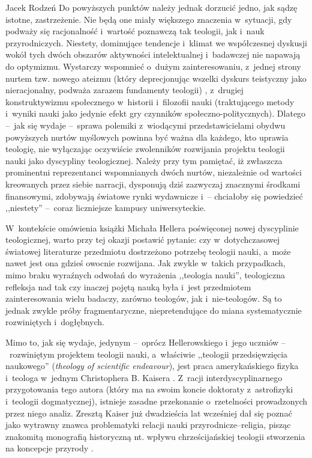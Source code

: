 \begin{newrevplenv}{Jacek Rodzeń}
Do powyższych punktów należy jednak dorzucić jedno, jak sądzę istotne, zastrzeżenie. Nie będą one miały większego znaczenia w~sytuacji, gdy podważy się racjonalność i~wartość poznawczą tak teologii, jak i~nauk przyrodniczych. Niestety, dominujące tendencje i~klimat we współczesnej dyskusji wokół tych dwóch obszarów aktywności intelektualnej i~badawczej nie napawają do optymizmu. Wystarczy wspomnieć o~dużym zainteresowaniu, z~jednej strony nurtem tzw. nowego ateizmu (który deprecjonując wszelki dyskurs teistyczny jako nieracjonalny, podważa zarazem fundamenty teologii)
\parencite[zob.][]{haught_god_2008}, %
 z~drugiej konstruktywizmu społecznego w~historii i~filozofii nauki (traktującego metody i~wyniki nauki jako jedynie efekt gry czynników społeczno-politycznych). Dlatego --~jak się wydaje --~sprawa polemiki z~wiodącymi przedstawicielami obydwu powyższych nurtów myślowych powinna być ważna dla każdego, kto uprawia teologię, nie wyłączając oczywiście zwolenników rozwijania projektu teologii nauki jako dyscypliny teologicznej. Należy przy tym pamiętać, iż zwłaszcza prominentni reprezentanci wspomnianych dwóch nurtów, niezależnie od wartości kreowanych przez siebie narracji, dysponują dziś zazwyczaj znacznymi środkami finansowymi, zdobywają światowe rynki wydawnicze i~– chciałoby się powiedzieć ,,niestety'' --~coraz liczniejsze kampusy uniwersyteckie.

W~kontekście omówienia książki Michała Hellera poświęconej nowej dyscyplinie teologicznej, warto przy tej okazji postawić pytanie: czy w~dotychczasowej światowej literaturze przedmiotu dostrzeżono potrzebę teologii nauki, a~może nawet jest ona gdzieś owocnie rozwijana. Jak zwykle w~takich przypadkach, mimo braku wyraźnych odwołań do wyrażenia ,,teologia nauki'', teologiczna refleksja nad tak czy inaczej pojętą nauką była i~jest przedmiotem zainteresowania wielu badaczy, zarówno teologów, jak i~nie-teologów. Są to jednak zwykle próby fragmentaryczne, niepretendujące do miana systematycznie rozwiniętych i~dogłębnych.

Mimo to, jak się wydaje, jedynym --~oprócz Hellerowskiego i~jego uczniów --~rozwiniętym projektem teologii nauki, a~właściwie ,,teologii przedsięwzięcia naukowego'' (\textit{theology of scientific endeavour}), jest praca amerykańskiego fizyka i~teologa w~jednym Christophera B. Kaisera
\parencite*[][]{kaiser_toward_2007}. %
 Z~racji interdyscyplinarnego przygotowania tego autora (który ma na swoim koncie doktoraty z~astrofizyki i~teologii dogmatycznej), istnieje zasadne przekonanie o~rzetelności prowadzonych przez niego analiz. Zresztą Kaiser już dwadzieścia lat wcześniej dał się poznać jako wytrawny znawca problematyki relacji nauki przyrodnicze–religia, pisząc znakomitą monografią historyczną nt. wpływu chrześcijańskiej teologii stworzenia na koncepcje przyrody 
\parencite[][]{kaiser_creational_1997}.%



\end{newrevplenv}
